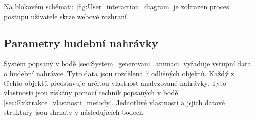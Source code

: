 Na blokovém schématu \ref{fig:User_interaction_diagram} je zobrazen proces postupu uživatele skrze webové rozhraní. 

\subsection{Parametry hudební nahrávky} \label{sec:Parametry_nahravky}

Systém popsaný v bodě \ref{sec:System_generovani_animaci} vyžaduje vstupní data o hudební nahrávce. Tyto data jsou rozdělena 7 odlišných objektů. Každý z těchto objektů představuje určitou vlastnost analyzované nahrávky. Tyto vlastnosti jsou získány pomocí technik popsaných v bodě \ref{sec:Exktrakce_vlastnosti_metody}. Jednotlivé vlastnosti a jejich datové struktury jsou shrnuty v následujících bodech.

